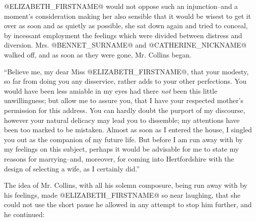 @ELIZABETH_FIRSTNAME@ would not oppose such an injunction--and a moment's
consideration making her also sensible that it would be wisest to get it
over as soon and as quietly as possible, she sat down again and tried to
conceal, by incessant employment the feelings which were divided between
distress and diversion. Mrs. @BENNET_SURNAME@ and @CATHERINE_NICKNAME@ walked off, and as soon as
they were gone, Mr. Collins began.

``Believe me, my dear Miss @ELIZABETH_FIRSTNAME@, that your modesty, so far from
doing you any disservice, rather adds to your other perfections. You
would have been less amiable in my eyes had there \textit{not} been this little
unwillingness; but allow me to assure you, that I have your respected
mother's permission for this address. You can hardly doubt the
purport of my discourse, however your natural delicacy may lead you to
dissemble; my attentions have been too marked to be mistaken. Almost as
soon as I entered the house, I singled you out as the companion of
my future life. But before I am run away with by my feelings on this
subject, perhaps it would be advisable for me to state my reasons for
marrying--and, moreover, for coming into Hertfordshire with the design
of selecting a wife, as I certainly did.''

The idea of Mr. Collins, with all his solemn composure, being run away
with by his feelings, made @ELIZABETH_FIRSTNAME@ so near laughing, that she could
not use the short pause he allowed in any attempt to stop him further,
and he continued:

